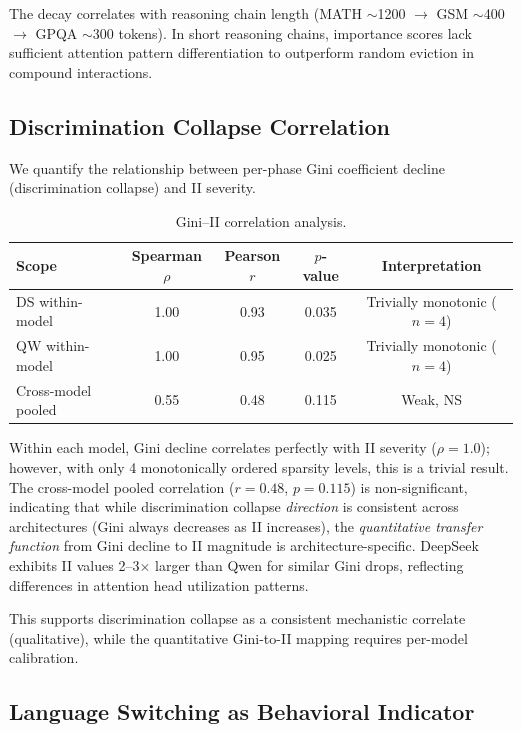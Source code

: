 \documentclass[11pt,a4paper]{article}
\begin{document}
The decay correlates with reasoning chain length (MATH $\sim$1200 $\to$ GSM $\sim$400 $\to$ GPQA $\sim$300 tokens). In short reasoning chains, importance scores lack sufficient attention pattern differentiation to outperform random eviction in compound interactions.

\subsection{Discrimination Collapse Correlation}

We quantify the relationship between per-phase Gini coefficient decline (discrimination collapse) and II severity.

\begin{table}[h]
\centering
\small
\caption{Gini--II correlation analysis.}
\begin{tabular}{lcccc}
\toprule
Scope & Spearman $\rho$ & Pearson $r$ & $p$-value & Interpretation \\
\midrule
DS within-model & 1.00 & 0.93 & 0.035 & Trivially monotonic ($n=4$) \\
QW within-model & 1.00 & 0.95 & 0.025 & Trivially monotonic ($n=4$) \\
Cross-model pooled & 0.55 & 0.48 & 0.115 & Weak, NS \\
\bottomrule
\end{tabular}
\label{tab:gini_correlation}
\end{table}

Within each model, Gini decline correlates perfectly with II severity ($\rho = 1.0$); however, with only 4 monotonically ordered sparsity levels, this is a trivial result. The cross-model pooled correlation ($r = 0.48$, $p = 0.115$) is non-significant, indicating that while discrimination collapse \emph{direction} is consistent across architectures (Gini always decreases as II increases), the \emph{quantitative transfer function} from Gini decline to II magnitude is architecture-specific. DeepSeek exhibits II values 2--3$\times$ larger than Qwen for similar Gini drops, reflecting differences in attention head utilization patterns.

This supports discrimination collapse as a consistent mechanistic correlate (qualitative), while the quantitative Gini-to-II mapping requires per-model calibration.

\subsection{Language Switching as Behavioral Indicator}
\end{document}
